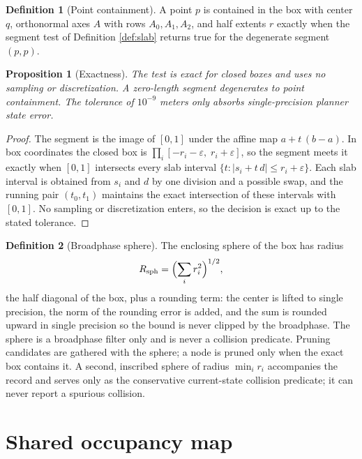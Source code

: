 \documentclass[10pt,a4paper]{article}
\theoremstyle{plain}
\newtheorem{proposition}{Proposition}[section]
\theoremstyle{definition}
\newtheorem{definition}{Definition}[section]
\theoremstyle{remark}
\begin{document}
\begin{definition}[Point containment]\label{def:contain}
A point $p$ is contained in the box with center $q$, orthonormal axes $A$ with rows $A_0, A_1, A_2$, and half extents $r$ exactly when the segment test of Definition \ref{def:slab} returns true for the degenerate segment $(p, p)$.
\end{definition}

\begin{proposition}[Exactness]\label{prop:exact}
The test is exact for closed boxes and uses no sampling or discretization. A zero-length segment degenerates to point containment. The tolerance of $10^{-9}$ meters only absorbs single-precision planner state error.
\end{proposition}

\begin{proof}
The segment is the image of $[0,1]$ under the affine map $a + t\,(b - a)$. In box coordinates the closed box is $\prod_i [-r_i - \varepsilon,\; r_i + \varepsilon]$, so the segment meets it exactly when $[0,1]$ intersects every slab interval $\{t : |s_i + t\,d| \le r_i + \varepsilon\}$. Each slab interval is obtained from $s_i$ and $d$ by one division and a possible swap, and the running pair $(t_0, t_1)$ maintains the exact intersection of these intervals with $[0,1]$. No sampling or discretization enters, so the decision is exact up to the stated tolerance.
\end{proof}

\begin{definition}[Broadphase sphere]\label{def:broadphase}
The enclosing sphere of the box has radius
\begin{equation}
R_{\mathrm{sph}} = \Bigl(\sum_i r_i^2\Bigr)^{1/2},
\end{equation}
the half diagonal of the box, plus a rounding term: the center is lifted to single precision, the norm of the rounding error is added, and the sum is rounded upward in single precision so the bound is never clipped by the broadphase. The sphere is a broadphase filter only and is never a collision predicate. Pruning candidates are gathered with the sphere; a node is pruned only when the exact box contains it. A second, inscribed sphere of radius $\min_i r_i$ accompanies the record and serves only as the conservative current-state collision predicate; it can never report a spurious collision.
\end{definition}

\section{Shared occupancy map}
\end{document}
